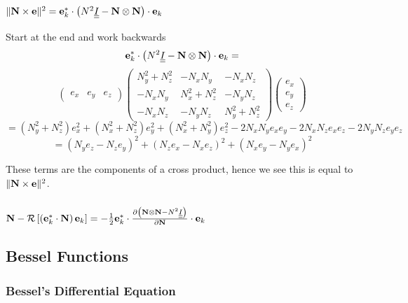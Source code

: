 \subsubsection{$\|\textbf{N} \times \textbf{e}\|^2 = \textbf{e}_k^{*} \cdot \left( N^2 \underline{\underline{I}} - \textbf{N} \otimes \textbf{N} \right) \cdot \textbf{e}_k$}\label{vector identity 1}
Start at the end and work backwards
\begin{equation*}
	\textbf{e}_k^{*} \cdot \left( N^2 \underline{\underline{I}} - \textbf{N} \otimes \textbf{N} \right) \cdot \textbf{e}_k =
\end{equation*}
\begin{equation*}
 \begin{pmatrix}
		e_x & e_y & e_z
	\end{pmatrix}
	\begin{pmatrix}
		N_y^2 + N_z^2 & -N_x N_y & -N_x N_z \\
		-N_x N_y & N_x^2 + N_z^2 & -N_y N_z \\
		-N_x N_z & -N_y N_z & N_y^2 + N_z^2
	\end{pmatrix}
	\begin{pmatrix}
		e_x \\ e_y \\ e_z
	\end{pmatrix}
\end{equation*}
\begin{equation*}
	= \left( N_y^2 + N_z^2 \right) e_x^2 + \left( N_x^2 + N_z^2 \right) e_y^2 + \left( N_x^2 + N_y^2 \right) e_z^2 - 2 N_x N_y e_x e_y - 2 N_x N_z e_x e_z - 2 N_y N_z e_y e_z
\end{equation*}
\begin{equation}
	= \left( N_y e_z - N_z e_y \right)^2 + \left( N_z e_x - N_x e_z \right)^2 + \left( N_x e_y - N_y e_x \right)^2
\end{equation}

These terms are the components of a cross product, hence we see this is equal to $\|\textbf{N} \times \textbf{e}\|^2$.

\subsubsection{$\textbf{N} - \mathcal{R} \left[ \left( \textbf{e}_k^* \cdot \textbf{N} \right) \textbf{e}_k \right] = - \frac{1}{2} \textbf{e}_k^* \cdot \frac{\partial \left( \textbf{N} \otimes \textbf{N} - N^2 \underline{\underline{I}} \right)}{\partial \textbf{N}} \cdot \textbf{e}_k$} \label{vector identity 2}

\subsection{Bessel Functions}
\subsubsection{Bessel's Differential Equation}


